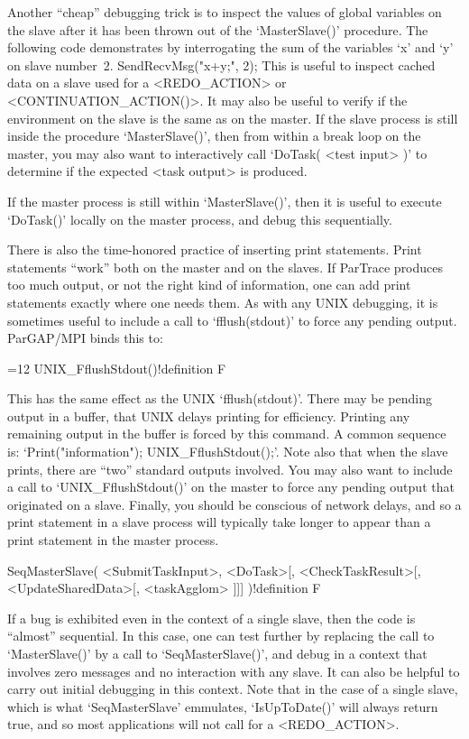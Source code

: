 Another ``cheap'' debugging trick is to inspect the values
of global variables on the slave after it has been thrown out of the
`MasterSlave()' procedure. The following code demonstrates by
interrogating the sum of the variables `x' and `y' on slave number~2.
\begintt
    SendRecvMsg("x+y;\n", 2);
\endtt
This is useful to inspect cached data on a slave used for a
<REDO_ACTION> or <CONTINUATION_ACTION()>.  It may also be useful to
verify if the environment on the slave is the same as on the master.
If the slave process is still inside the procedure `MasterSlave()', then
from within a break loop on the master, you may also want to
interactively call `DoTask( <test input> )' to determine if the
expected <task output> is produced.

If the master process is still within `MasterSlave()', then it is
useful to execute `DoTask()' locally on the master process,
and debug this sequentially.

There is also the time-honored practice of inserting print statements.
Print statements ``work'' both on the master and on the slaves.
If ParTrace produces too much output, or not the right kind of information, one
can add print statements exactly where one needs them.
As with any UNIX debugging, it is sometimes useful to
include a call to `fflush(stdout)' to force any pending output.
ParGAP/MPI binds this to:

{=12
\>UNIX_FflushStdout()!{definition} F
\par}

This has the same effect as the UNIX `fflush(stdout)'.  There may be
pending output in a buffer, that UNIX delays printing for efficiency.
Printing any remaining output in the buffer is forced by this command.
A common sequence is: `Print("information"); UNIX_FflushStdout();'.
Note also that when the slave prints, there are ``two'' standard outputs
involved.  You may also want to include a call to `UNIX_FflushStdout()'
on the master to force any pending output that originated on a slave.
Finally, you should be conscious of network delays, and so a print
statement in a slave process will typically take longer to appear than a print
statement in the master process.

\>SeqMasterSlave( <SubmitTaskInput>, <DoTask>[, <CheckTaskResult>[,
                  <UpdateSharedData>[, <taskAgglom> ]]] )!{definition} F

If a bug is exhibited even in the context of a single slave, then
the code is ``almost'' sequential.  In this case,
one can test further by replacing the call to `MasterSlave()' by
a call to `SeqMasterSlave()', and debug in a context that involves
zero messages and no interaction with any slave.  It can also be helpful
to carry out initial debugging in this context.  Note that in the
case of a single slave, which is what `SeqMasterSlave' emmulates,
`IsUpToDate()' will always return true, and so most applications will
not call for a <REDO_ACTION>.

